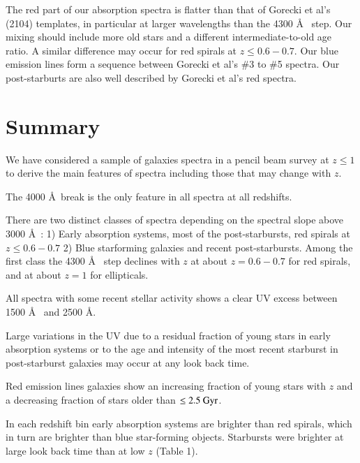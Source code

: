 \documentclass[referee]{aa}
\begin{document}
The red part of our absorption spectra is flatter than that of Gorecki et al's (2104) templates, in
particular at larger wavelengths than the 4300 \AA ~ step. Our mixing should include
more old stars and a different intermediate-to-old age ratio. A similar difference may occur
for red spirals at $ z \leq 0.6-0.7$. Our blue emission lines form a sequence between Gorecki et
 al's \#3 to \#5 spectra.  Our post-starburts are also well described by Gorecki et al's red spectra.


\section{Summary}
\label{conclusion}

We have considered a sample of galaxies spectra in a pencil beam survey at $z \leq 1$ to derive the main
features of spectra including those that may change with $z$.

The 4000 \AA~break is the only feature in all spectra at all redshifts. 

There are two distinct classes of
spectra depending on the spectral slope above 3000  \AA ~: 1) Early absorption systems,  most
of the post-starbursts, red spirals at $z \leq 0.6-0.7$ 2) Blue starforming galaxies and recent
post-starbursts. Among the first class the 4300 \AA~ step declines with $z$ at about
$z = 0.6-0.7$ for red spirals, and at about $z = 1$ for ellipticals.

All spectra with some recent stellar activity shows a clear UV excess between 1500 \AA~ and 2500 \AA.

Large variations in the UV  due to a residual fraction of young stars in early absorption
systems or to the age and intensity of the most recent starburst in post-starburst galaxies
may occur at any look back time.

Red emission lines galaxies show an increasing fraction of young stars with $z$ and a decreasing
fraction of stars older than $\rm \leq 2.5~ Gyr$.

In each redshift bin early absorption systems are brighter than red spirals, which in turn are brighter than 
blue star-forming objects. Starbursts were brighter at large look back time than at low $z$ (Table 1).
 
\begin{acknowledgements}

\end{acknowledgements}
\end{document}

